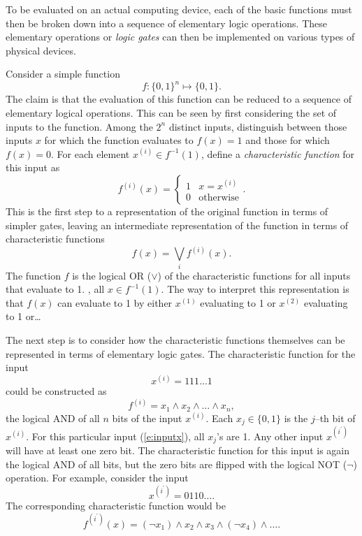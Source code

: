 To be evaluated on an actual computing device,
each of the basic functions must then be broken down into a 
sequence
of elementary logic operations.  These elementary operations
or {\sl logic gates} 
can then be implemented on various types 
of physical devices.

Consider a simple function
\begin{equation}
f\colon\lbrace 0,1\rbrace^n \mapsto \lbrace 0,1\rbrace.
\end{equation}
The claim is that the evaluation of this function can be
reduced to a sequence of elementary logical operations.
This can be seen by first considering the set of inputs
to the function.  Among the $2^n$ distinct inputs, distinguish
between those inputs $x$ for which the function evaluates to 
$f(x)=1$ and those for which $f(x)=0$.  
For each element
$x^{(i)}\in f^{-1}(1)$, define a {\sl characteristic function}
for this input as
\begin{equation}
f^{(i)}(x) = \begin{cases}
                1&x=x^{(i)}\\
                0&\text{otherwise}
             \end{cases}.
\end{equation}
This is the first step to a representation of the original function
in terms of simpler gates,  leaving an intermediate representation
of the function in terms of characteristic functions
\begin{equation}
f(x) = \bigvee_i f^{(i)}(x).
\end{equation}
The function $f$ is the logical OR ($\vee$) of the characteristic functions
for all inputs that evaluate to 1. \ie, all $x\in f^{-1}(1)$.
The way to interpret this representation is that $f(x)$ can evaluate
to 1 by either $x^{(1)}$ evaluating to 1 or $x^{(2)}$ evaluating to 1 
or\dots

The next step is to consider how the characteristic functions themselves
can be represented in terms of elementary logic gates.
The characteristic function for the input
\begin{equation}
x^{(i)} = 111\ldots1
\label{e:inputx}
\end{equation}
could be constructed as
\begin{equation}
f^{(i)} = x_1 \wedge x_2 \wedge \ldots\wedge x_n,
\end{equation}
the logical AND of all $n$ bits of the input $x^{(i)}$.
Each $x_j\in\lbrace 0,1\rbrace$ is the $j$--th bit of $x^{(i)}$.  
For this particular input (\ref{e:inputx}), all $x_j$'s are 1.
Any other input $x^{(i^\prime )}$ will have at least one zero bit.  
The characteristic function for this input is again the logical
AND of all bits, but the zero bits are flipped with the logical
NOT ($\neg$) operation.  For example, consider the input
\begin{equation}
x^{(i^\prime )} = 0110\ldots.
\end{equation}
The corresponding characteristic function would be 
\begin{equation}
f^{(i^\prime )}(x) = (\neg x_1 )\wedge x_2\wedge x_3\wedge (\neg x_4 )
\wedge\ldots.
\end{equation}

